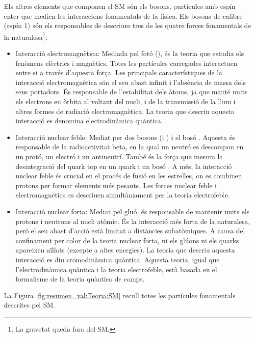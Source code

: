 Els altres elements que componen el SM són els bosons, partícules amb espín enter que medien les 
interaccions fonamentals de la física. Els bosons de calibre (espín 1) són els responsables de descriure 
tres de les quatre forces fonamentals de la naturalesa\footnote{La gravetat queda fora del SM.}:

\begin{itemize}
	\item Interacció electromagnètica: Mediada pel fotó (\Pgamma), és la teoria que estudia 
	els fenòmens elèctrics i magnètics. Totes les partícules carregades interactuen entre si a 
	través d'aquesta força. Les principals característiques de la interacció electromagnètica són 
	el seu abast infinit i l'absència de massa dels seus portadors. És responsable de l'estabilitat 
	dels àtoms, ja que manté units els electrons en òrbita al voltant del nucli, i de la transmissió 
	de la llum i altres formes de radiació electromagnètica. La teoria que descriu aquesta interacció 
	es denomina electrodinàmica quàntica.
	
	\item Interacció nuclear feble: Mediat per dos bosons \PW (\PWplus i \PWminus) i el bosó \PZ. 
	Aquesta és responsable de la radioactivitat beta, en la qual un neutró es descompon en un 
	protó, un electró i un antineutrí. També és la força que mesura la desintegració del quark top 
	en un quark \Pbottom i un bosó \PW. A més, la interacció nuclear feble és crucial en el procés 
	de fusió en les estrelles, on es combinen protons per formar elements més pesants. Les forces 
	nuclear feble i electromagnètica es descriuen simultàniament per la teoria electrofeble.
	
	\item Interacció nuclear forta: Mediat pel gluó, és responsable de mantenir units els protons i 
	neutrons al nucli atòmic. És la interacció més forta de la naturalesa, però el seu abast d'acció 
	està limitat a distàncies subatòmiques. A causa del confinament per color de la teoria nuclear 
	forta, ni els glúons ni els quarks apareixen aïllats (excepte a altes energies). La teoria que descriu 
	aquesta interacció es diu cromodinàmica quàntica. Aquesta teoria, igual que l'electrodinàmica 
	quàntica i la teoria electrofeble, està basada en el formalisme de la teoria quàntica de camps.
\end{itemize}

La Figura \ref{fig:resumen_val:Teoria:SM} recull totes les partícules fonamentals descrites pel SM.

